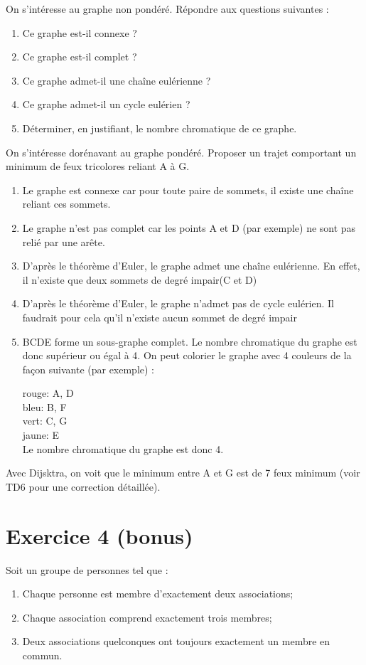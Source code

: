 \documentclass[10pt,a4paper]{article}
\begin{document}
 On s'intéresse au graphe non pondéré. Répondre aux questions suivantes :
\begin{enumerate}
    \item Ce graphe est-il connexe ?
    \item Ce graphe est-il complet ?
    \item Ce graphe admet-il une chaîne eulérienne ?
    \item Ce graphe admet-il un cycle eulérien ?
    \item Déterminer, en justifiant, le nombre chromatique de ce graphe.
\end{enumerate}
On s'intéresse dorénavant au graphe pondéré. Proposer un trajet comportant un minimum de feux tricolores reliant A à G.

\begin{tcolorbox}
\begin{enumerate}
    \item Le graphe est connexe car pour toute paire de sommets, il existe une chaîne reliant ces sommets.
    \item Le graphe n'est pas complet car les points A et D (par exemple) ne sont pas relié par une arête.
    \item D'après le théorème d'Euler, le graphe admet une chaîne eulérienne. En effet, il n'existe que deux sommets de degré impair(C et D)
    \item D'après le théorème d'Euler, le graphe n'admet pas de cycle eulérien. Il faudrait pour cela qu'il n'existe aucun sommet de degré impair
    \item BCDE forme un sous-graphe complet. Le nombre chromatique du graphe est donc supérieur ou égal à 4.
    On peut colorier le graphe avec 4 couleurs de la façon suivante (par exemple) :

rouge: A, D\\
bleu: B, F\\
vert: C, G\\
jaune: E\\

Le nombre chromatique du graphe est donc 4. 

\end{enumerate}

Avec Dijsktra, on voit que le minimum entre A et G est de 7 feux minimum (voir TD6 pour une correction détaillée).

\end{tcolorbox}


\section*{Exercice 4 (bonus)}
Soit un groupe de personnes tel que :
\begin{enumerate}
    \item Chaque personne est membre d’exactement deux associations;
    \item Chaque association comprend exactement trois membres;
    \item Deux associations quelconques ont toujours exactement un membre en commun.
\end{enumerate}
 
\end{document}
